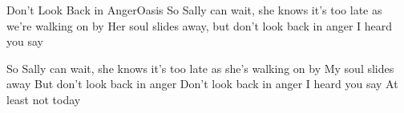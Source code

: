 \begin{song}{Don't Look Back in Anger}{Oasis}{}
So Sally can wait, she knows it's too late
as we're walking on by
Her soul slides away, but don't look back in anger
I heard you say

So Sally can wait, she knows it's too late
as she's walking on by
My soul slides away
But don't look back in anger
Don't look back in anger
I heard you say                     At least not today
\end{song}
